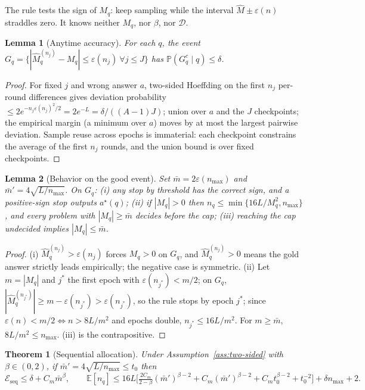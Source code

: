 \documentclass[11pt]{article}
\newtheorem{theorem}{Theorem}
\newtheorem{lemma}{Lemma}
\newcommand{\D}{\mathcal D}
\newcommand{\E}{\mathbb E}
\newcommand{\Pp}{\mathbb P}
\newcommand{\eps}{\varepsilon}
\newcommand{\Mhat}{\widehat M}
\newcommand{\nmax}{n_{\max}}
\begin{document}
\medskip
The rule tests the sign of $M_q$: keep sampling while the interval
$\Mhat\pm\eps(n)$ straddles zero.  It knows neither $M_q$, nor $\beta$, nor
$\D$.

\begin{lemma}[Anytime accuracy]
\label{lem:anytime}
For each $q$, the event
$G_q=\{|\Mhat^{(n_j)}_q-M_q|\le\eps(n_j)\ \forall j\le J\}$ has
$\Pp(G_q^c\mid q)\le\delta$.
\end{lemma}

\begin{proof}
For fixed $j$ and wrong answer $a$, two-sided Hoeffding on the first $n_j$
per-round differences gives deviation probability $\le2e^{-n_j\eps(n_j)^2/2}
=2e^{-L}=\delta/((A-1)J)$; union over $a$ and the $J$ checkpoints; the
empirical margin (a minimum over $a$) moves by at most the largest pairwise
deviation.  Sample reuse across epochs is immaterial: each checkpoint
constrains the average of the first $n_j$ rounds, and the union bound is
over fixed checkpoints.
\end{proof}

\begin{lemma}[Behavior on the good event]
\label{lem:behavior}
Set $\bar m=2\eps(\nmax)$ and $\bar m'=4\sqrt{L/\nmax}$.  On $G_q$:
(i) any stop by threshold has the correct sign, and a positive-sign stop
outputs $a^\star(q)$;
(ii) if $|M_q|>0$ then $n_q\le\min\{16L/M_q^2,\nmax\}$, and every problem
with $|M_q|\ge\bar m$ decides before the cap;
(iii) reaching the cap undecided implies $|M_q|\le\bar m$.
\end{lemma}

\begin{proof}
(i) $\Mhat^{(n_j)}_q>\eps(n_j)$ forces $M_q>0$ on $G_q$, and
$\Mhat^{(n_j)}_q>0$ means the gold answer strictly leads empirically; the
negative case is symmetric.  (ii) Let $m=|M_q|$ and $j^\ast$ the first epoch
with $\eps(n_{j^\ast})<m/2$; on $G_q$,
$|\Mhat^{(n_{j^\ast})}_q|\ge m-\eps(n_{j^\ast})>\eps(n_{j^\ast})$, so the
rule stops by epoch $j^\ast$; since $\eps(n)<m/2\iff n>8L/m^2$ and epochs
double, $n_{j^\ast}\le16L/m^2$.  For $m\ge\bar m$, $8L/m^2\le\nmax$.
(iii) is the contrapositive.
\end{proof}

\begin{theorem}[Sequential allocation]
\label{thm:sequential}
Under Assumption~\ref{ass:two-sided} with $\beta\in(0,2)$, if
$\bar m'=4\sqrt{L/\nmax}\le t_0$ then
\[
\mathcal E_{\mathrm{seq}}
\le
\delta+C_m\bar m^\beta,
\qquad
\E[n_q]
\le
16L\Big[\tfrac{2C_m}{2-\beta}(\bar m')^{\beta-2}
+C_m(\bar m')^{\beta-2}+C_mt_0^{\beta-2}+t_0^{-2}\Big]
+\delta\nmax+2 .
\]
\end{theorem}
\end{document}

